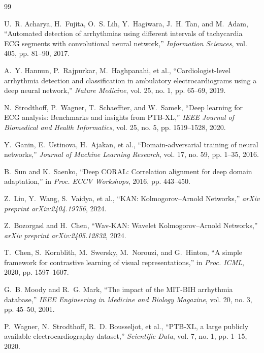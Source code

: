 \documentclass[journal,twoside,web]{ieeecolor}
\begin{document}


\begin{thebibliography}{99}

U.~R. Acharya, H.~Fujita, O.~S. Lih, Y.~Hagiwara, J.~H. Tan, and M.~Adam,
``Automated detection of arrhythmias using different intervals of tachycardia ECG segments with convolutional neural network,''
\textit{Information Sciences}, vol. 405, pp. 81--90, 2017.

A.~Y. Hannun, P.~Rajpurkar, M.~Haghpanahi, et al.,
``Cardiologist-level arrhythmia detection and classification in ambulatory electrocardiograms using a deep neural network,''
\textit{Nature Medicine}, vol. 25, no. 1, pp. 65--69, 2019.

N.~Strodthoff, P.~Wagner, T.~Schaeffter, and W.~Samek,
``Deep learning for ECG analysis: Benchmarks and insights from PTB-XL,''
\textit{IEEE Journal of Biomedical and Health Informatics}, vol. 25, no. 5, pp. 1519--1528, 2020.

Y.~Ganin, E.~Ustinova, H.~Ajakan, et al.,
``Domain-adversarial training of neural networks,''
\textit{Journal of Machine Learning Research}, vol. 17, no. 59, pp. 1--35, 2016.

B.~Sun and K.~Saenko,
``Deep CORAL: Correlation alignment for deep domain adaptation,''
in \textit{Proc. ECCV Workshops}, 2016, pp. 443--450.

Z.~Liu, Y.~Wang, S.~Vaidya, et al.,
``KAN: Kolmogorov--Arnold Networks,''
\textit{arXiv preprint arXiv:2404.19756}, 2024.

Z.~Bozorgasl and H.~Chen,
``Wav-KAN: Wavelet Kolmogorov--Arnold Networks,''
\textit{arXiv preprint arXiv:2405.12832}, 2024.

T.~Chen, S.~Kornblith, M.~Swersky, M.~Norouzi, and G.~Hinton,
``A simple framework for contrastive learning of visual representations,''
in \textit{Proc. ICML}, 2020, pp. 1597--1607.

G.~B. Moody and R.~G. Mark,
``The impact of the MIT-BIH arrhythmia database,''
\textit{IEEE Engineering in Medicine and Biology Magazine}, vol. 20, no. 3, pp. 45--50, 2001.

P.~Wagner, N.~Strodthoff, R.~D. Bousseljot, et al.,
``PTB-XL, a large publicly available electrocardiography dataset,''
\textit{Scientific Data}, vol. 7, no. 1, pp. 1--15, 2020.


\end{thebibliography}
\end{document}
